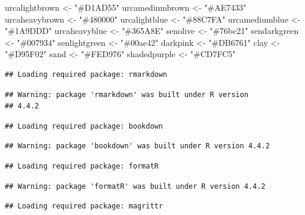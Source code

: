 \documentclass[french,]{compterendu}
\newenvironment{Shaded}{\begin{snugshade}}{\end{snugshade}}
\newcommand{\NormalTok}[1]{#1}
\newcommand{\OtherTok}[1]{\textcolor[rgb]{0.56,0.35,0.01}{#1}}
\newcommand{\StringTok}[1]{\textcolor[rgb]{0.31,0.60,0.02}{#1}}
\theoremstyle{urcastyle}
\theoremstyle{remark}
\begin{document}
\begin{Shaded}
\begin{Highlighting}[]
\NormalTok{urcalightbrown }\OtherTok{\textless{}{-}} \StringTok{"\#D1AD55"}
\NormalTok{urcamediumbrown }\OtherTok{\textless{}{-}} \StringTok{"\#AE7433"}
\NormalTok{urcaheavybrown }\OtherTok{\textless{}{-}} \StringTok{"\#480000"}
\NormalTok{urcalightblue }\OtherTok{\textless{}{-}} \StringTok{"\#88C7FA"}
\NormalTok{urcamediumblue }\OtherTok{\textless{}{-}} \StringTok{"\#1A9DDD"}
\NormalTok{urcaheavyblue }\OtherTok{\textless{}{-}} \StringTok{"\#365A8E"}
\NormalTok{senolive }\OtherTok{\textless{}{-}} \StringTok{"\#76bc21"}
\NormalTok{sendarkgreen }\OtherTok{\textless{}{-}} \StringTok{"\#007934"}
\NormalTok{senlightgreen }\OtherTok{\textless{}{-}} \StringTok{"\#00ae42"}
\NormalTok{darkpink }\OtherTok{\textless{}{-}} \StringTok{"\#DB6761"}
\NormalTok{clay }\OtherTok{\textless{}{-}} \StringTok{"\#D95F02"}
\NormalTok{sand }\OtherTok{\textless{}{-}} \StringTok{"\#FED976"}
\NormalTok{shadedpurple }\OtherTok{\textless{}{-}} \StringTok{"\#CD7FC5"}
\end{Highlighting}
\end{Shaded}

\begin{verbatim}
## Loading required package: rmarkdown
\end{verbatim}

\begin{verbatim}
## Warning: package 'rmarkdown' was built under R version
## 4.4.2
\end{verbatim}

\begin{verbatim}
## Loading required package: bookdown
\end{verbatim}

\begin{verbatim}
## Warning: package 'bookdown' was built under R version 4.4.2
\end{verbatim}

\begin{verbatim}
## Loading required package: formatR
\end{verbatim}

\begin{verbatim}
## Warning: package 'formatR' was built under R version 4.4.2
\end{verbatim}

\begin{verbatim}
## Loading required package: magrittr
\end{verbatim}
\end{document}
